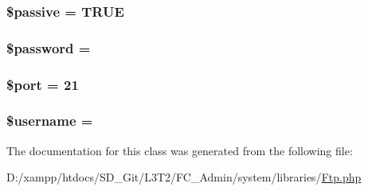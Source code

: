 \subsubsection[{\$passive}]{\setlength{\rightskip}{0pt plus 5cm}\$passive = T\+R\+U\+E}\label{class_c_i___f_t_p_a9fb61732ea9189fa2be5574ad3576d9c}
\hypertarget{class_c_i___f_t_p_a607686ef9f99ea7c42f4f3dd3dbb2b0d}{}
\subsubsection[{\$password}]{\setlength{\rightskip}{0pt plus 5cm}\$password = \textquotesingle{}\textquotesingle{}}\label{class_c_i___f_t_p_a607686ef9f99ea7c42f4f3dd3dbb2b0d}
\hypertarget{class_c_i___f_t_p_aa0787efab4b22e8a212882f3409d4c77}{}
\subsubsection[{\$port}]{\setlength{\rightskip}{0pt plus 5cm}\$port = 21}\label{class_c_i___f_t_p_aa0787efab4b22e8a212882f3409d4c77}
\hypertarget{class_c_i___f_t_p_a0eb82aa5f81cf845de4b36cd653c42cf}{}
\subsubsection[{\$username}]{\setlength{\rightskip}{0pt plus 5cm}\$username = \textquotesingle{}\textquotesingle{}}\label{class_c_i___f_t_p_a0eb82aa5f81cf845de4b36cd653c42cf}


The documentation for this class was generated from the following file\+:\begin{DoxyCompactItemize}
\item 
D\+:/xampp/htdocs/\+S\+D\+\_\+\+Git/\+L3\+T2/\+F\+C\+\_\+\+Admin/system/libraries/\hyperlink{_ftp_8php}{Ftp.\+php}\end{DoxyCompactItemize}
